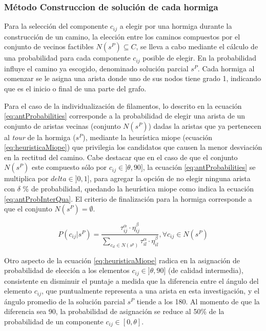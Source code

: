 \subsubsection{M\'etodo Construccion de soluci\'on de cada hormiga}
Para la selecci\'on del componente $c_{ij}$ a elegir por una hormiga durante la construcci\'on de un camino, la elecci\'on entre los caminos compuestos por el conjunto de vecinos factibles $N(s^{P}) \subseteq C$, se lleva a cabo mediante el c\'alculo de una probabilidad para cada componente $c_{ij}$ posible de elegir. En la probabilidad influye el camino ya escogido, denominado soluci\'on parcial $s^{P}$. Cada hormiga al comenzar se le asigna una arista donde uno de sus nodos tiene grado 1, indicando que es el inicio o final de una parte del grafo. 

Para el caso de la individualizaci\'on de filamentos, lo descrito en la ecuaci\'on \eqref{eq:antProbabilities} corresponde a la probabilidad de elegir una arista de un conjunto de aristas vecinas (conjunto $N(s^{P})$) dadas la aristas que ya pertenecen al {\it tour} de la hormiga ($s^P$), mediante la heur\'istica miope (ecuaci\'on \eqref{eq:heuristicaMiope}) que privilegia los candidatos que causen la menor desviaci\'on en la rectitud del camino. Cabe destacar que en el caso de que el conjunto $N(s^{P})$ este compuesto s\'olo por $c_{ij} \in ]\theta, 90]$, la ecuaci\'on \eqref{eq:antProbabilities} se multiplica por $delta \in ]0,1]$, para agregar la opci\'on de no elegir ninguna arista con $\delta$ \% de probabilidad, quedando la heur\'istica miope como indica la ecuaci\'on \eqref{eq:antProbInterQua}. El criterio de finalizaci\'on para la hormiga corresponde a que el conjunto $N(s^{P}) = \emptyset$.

\begin{equation}
P(c_{ij} | s^{P}) = \frac
        {\tau_{ij}^{\alpha} \cdot \eta_{ij}^{\beta}}
        {\sum\limits_{c_{il}\in N(s^p)}{\tau_{il}^{\alpha} \cdot \eta_{il}^{\beta} } }, \forall c_{ij} \in N(s^{P})
\label{eq:antProbabilities}
\end{equation}

Otro aspecto de la ecuaci\'on \eqref{eq:heuristicaMiope} radica en la asignaci\'on de probabilidad de elecci\'on a los elementos $c_{ij} \in ]\theta, 90]$ (de calidad intermedia), consistente en disminuir el puntaje a medida que la diferencia entre el \'angulo del elemento $c_{ij}$, que puntualmente representa a una arista en esta investigaci\'on, y el \'angulo promedio de la soluci\'on parcial $s^P$ tiende a los 180\textdegree. Al momento de que la diferencia sea 90\textdegree, la probabilidad de asignaci\'on se reduce al 50\% de la probabilidad de un componente $c_{ij} \in [0, \theta]$.

